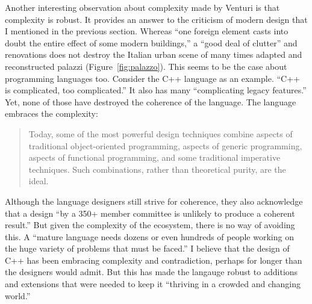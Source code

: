 Another interesting observation about complexity made by Venturi is that complexity is robust.
It provides an answer to the criticism of modern design that I mentioned in the previous section.
Whereas ``one foreign element casts into doubt the entire effect of some modern
buildings,'' a ``good deal of clutter'' and renovations does not destroy the
Italian urban scene of many times adapted and reconstructed palazzi (Figure~\ref{fig:palazzo}).
This seems to be the case about programming languages too. Consider the C++ language as an
example. ``C++ is complicated, too complicated.''
It also has many ``complicating legacy features.'' Yet, none of those have
destroyed the coherence of the language. The language embraces the complexity:

\begin{quote}
Today, some of the most powerful design techniques combine aspects of traditional object-oriented
programming, aspects of generic programming, aspects of functional programming, and some
traditional imperative techniques. Such combinations, rather than theoretical purity, are the
ideal.
\end{quote}

Although the language designers still strive for coherence, they also acknowledge that
a design ``by a 350+ member committee is unlikely to produce a coherent result.'' But given
the complexity of the ecosystem, there is no way of avoiding this. A  ``mature language needs
dozens or even hundreds of people working on the huge variety of problems that must be
faced.'' I believe that the
design of C++ has been embracing complexity and contradiction, perhaps for longer than the
designers would admit. But this has made the langauge robust to additions and extensions that
were needed to keep it ``thriving in a crowded and changing world.''


